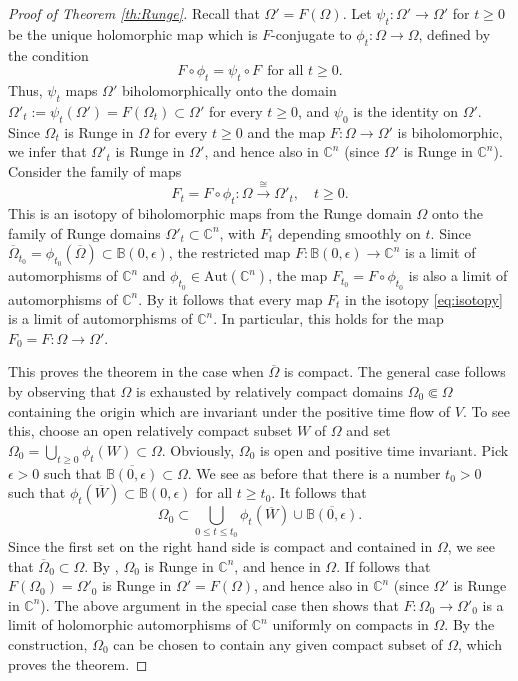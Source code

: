 \documentclass[10pt,a4paper]{amsart}
\newcommand\Aut{\mathrm{Aut}}
\newcommand\B{\mathbb{B}}
\newcommand\C{\mathbb{C}}
\begin{document}
\begin{proof}[Proof of Theorem \ref{th:Runge}]
Recall that $\Omega'=F(\Omega)$. 
Let $\psi_t:\Omega'\to \Omega'$ for $t\ge 0$ be the unique 
holomorphic map which is $F$-conjugate to $\phi_t:\Omega\to\Omega$,
defined by the condition
\[
	F\circ \phi_t = \psi_t \circ F\ \ \text{for all $t\ge 0$}.
\]
Thus, $\psi_t$ maps $\Omega'$ biholomorphically onto the domain
$
	\Omega'_t:=\psi_t(\Omega') =F(\Omega_t)\subset\Omega'
$
for every $t\ge 0$, and $\psi_0$ is the identity on $\Omega'$. 
Since $\Omega_t$ is Runge in $\Omega$ for every $t\ge 0$ 
and the map $F:\Omega\to\Omega'$ is biholomorphic, we infer
that $\Omega'_t$ is Runge in $\Omega'$, 
and hence also in $\C^n$ (since $\Omega'$ is Runge in $\C^n$). 
Consider the family of maps 
\begin{equation}\label{eq:isotopy}
	F_t = F\circ \phi_t : 
	\Omega \stackrel{\cong}{\longrightarrow} \Omega'_t,
	\quad t\ge 0.
\end{equation}
This is an isotopy of biholomorphic maps from the Runge domain $\Omega$
onto the family of Runge domains $\Omega'_t\subset \C^n$, 
with $F_t$ depending smoothly on $t$. Since 
$\overline \Omega_{t_0}= \phi_{t_0}(\overline \Omega)\subset \B(0,\epsilon)$, 
the restricted map $F:\B(0,\epsilon)\to \C^n$ is a limit of 
automorphisms of $\C^n$ and $\phi_{t_0}\in\Aut(\C^n)$,
the map $F_{t_0}=F\circ\phi_{t_0}$ is 
also a limit of automorphisms of $\C^n$. By 
\cite[Theorem 1.1]{ForstnericRosay1993} 
it follows that every map $F_t$ in the isotopy \eqref{eq:isotopy}
is a limit of automorphisms of $\C^n$. In particular, this holds for
the map $F_0=F:\Omega\to\Omega'$.

This proves the theorem in the case when $\overline\Omega$
is compact. The general case follows by observing that 
$\Omega$ is exhausted by relatively compact 
domains $\Omega_0\Subset \Omega$ containing the origin
which are invariant under the positive time flow of $V$. 
To see this, choose an open relatively compact subset $W$ of $\Omega$ 
and set $\Omega_0=\bigcup_{t\ge 0} \phi_t(W)\subset \Omega$.
Obviously, $\Omega_0$ is open and positive time invariant.
Pick $\epsilon>0$ such that $\overline{\B(0,\epsilon)}\subset\Omega$.
We see as before that there is a number $t_0>0$ 
such that $\phi_t(\overline W)\subset \B(0,\epsilon)$ for all $t\ge t_0$.
It follows that 
\[
	\Omega_0 \subset 
	\bigcup_{0\le t\le t_0}\phi_t(\overline W) \cup 
	\overline{\B(0,\epsilon)}.
\]
Since the first set on the right hand side is compact
and contained in $\Omega$, we see that 
$\overline \Omega_0\subset\Omega$.
By \cite[Theorem 1.1]{ChatterjeeGorai2025X}, 
$\Omega_0$ is Runge in $\C^n$, and hence in $\Omega$.
If follows that $F(\Omega_0)=\Omega'_0$ is Runge 
in $\Omega'=F(\Omega)$, and hence also in $\C^n$ 
(since $\Omega'$ is Runge in $\C^n$). The above argument 
in the special case then shows that $F:\Omega_0\to  \Omega'_0$ 
is a limit of holomorphic automorphisms of $\C^n$ uniformly on
compacts in $\Omega$. 
By the construction, $\Omega_0$ can be chosen to contain 
any given compact subset of $\Omega$, which proves the theorem.
\end{proof}
\end{document}
